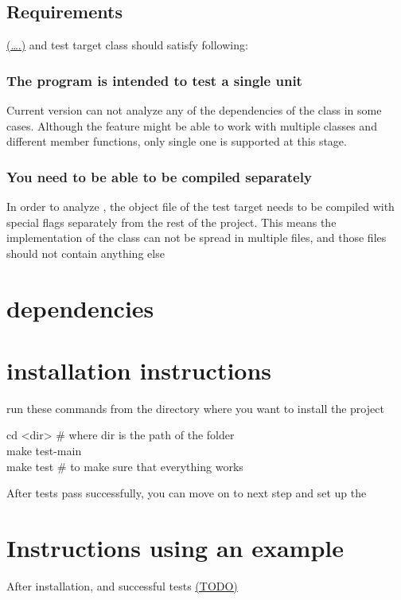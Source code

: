 \documentclass{elteikthesis}[2018/06/06]
\begin{document}
\subsection{Requirements}
\label{sec-2-1-1}
\uline{(\ldots{}.)} and test target class should satisfy following: \\
\subsubsection{The program is intended to test a single unit}
\label{sec-2-1-1-1}
Current version can not analyze any of the dependencies of the class in some cases. Although the feature might be able to work with multiple classes and different member functions, only single one is supported at this stage. \\
\subsubsection{You need to be able to be compiled separately}
\label{sec-2-1-1-2}
In order to analyze , the object file of the test target needs to be compiled with special flags separately from the rest of the project. This means the implementation of the class can not be spread in multiple files, and those files should not contain anything else \\
\section{dependencies}
\label{sec-2-2}
\section{installation instructions}
\label{sec-2-3}
run these commands from the directory where you want to install the project \\
\begin{listing}
cd <dir> \# where dir is the path of the folder \\

make test-main \\

make test \# to make sure that everything works \\
\end{listing}
After tests pass successfully, you can move on to next step and set up the \\
\section{Instructions using an example}
\label{sec-2-4}
After installation, and successful tests \uline{(TODO)} \\
\end{document}
